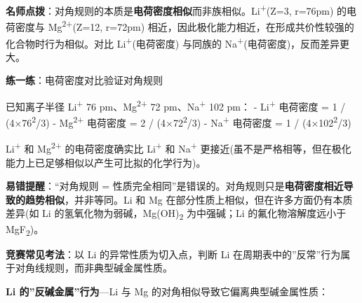 \textbf{名师点拨}：对角规则的本质是\textbf{电荷密度相似}而非族相似。Li\textsuperscript{+}(Z=3, r=76pm) 的电荷密度与 Mg\textsuperscript{2+}(Z=12, r=72pm) 相近，因此极化能力相近，在形成共价性较强的化合物时行为相似。对比 Li\textsuperscript{+}(电荷密度) 与同族的 Na\textsuperscript{+}(电荷密度)，反而差异更大。

\textbf{练一练}：电荷密度对比验证对角规则

已知离子半径 Li\textsuperscript{+} 76 pm、Mg\textsuperscript{2+} 72 pm、Na\textsuperscript{+} 102 pm：
- Li\textsuperscript{+} 电荷密度 = 1 / (4\派×76\textsuperscript{2}/3) 
- Mg\textsuperscript{2+} 电荷密度 = 2 / (4\派×72\textsuperscript{2}/3) 
- Na\textsuperscript{+} 电荷密度 = 1 / (4\派×102\textsuperscript{2}/3) 

Li\textsuperscript{+} 和 Mg\textsuperscript{2+} 的电荷密度确实比 Li\textsuperscript{+} 和 Na\textsuperscript{+} 更接近(虽不是严格相等，但在极化能力上已足够相似以产生可比拟的化学行为)。

\textbf{易错提醒}：``对角规则 = 性质完全相同''是错误的。对角规则只是\textbf{电荷密度相近导致的趋势相似}，并非等同。Li 和 Mg 在部分性质上相似，但在许多方面仍有本质差异(如 Li 的氢氧化物为弱碱，Mg(OH)\textsubscript{2} 为中强碱；Li 的氟化物溶解度远小于 MgF\textsubscript{2})。

\textbf{竞赛常见考法}：以 Li 的异常性质为切入点，判断 Li 在周期表中的''反常''行为属于对角线规则，而非典型碱金属性质。

\textbf{Li 的''反碱金属''行为}---Li 与 Mg 的对角相似导致它偏离典型碱金属性质：

